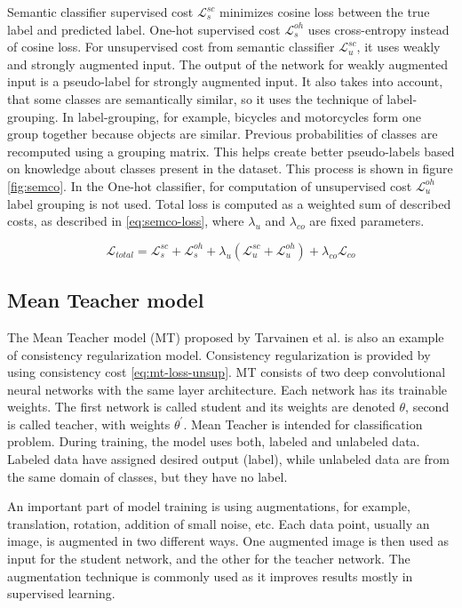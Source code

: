 Semantic classifier supervised cost $\mathcal{L}^{sc}_s$ minimizes cosine loss between the true label and predicted label. One-hot supervised cost $\mathcal{L}^{oh}_s$ uses cross-entropy instead of cosine loss. 
For unsupervised cost from semantic classifier $\mathcal{L}^{sc}_u$, it uses weakly and strongly augmented input. The output of the network for weakly augmented input is a pseudo-label for strongly augmented input. It also takes into account, that some classes are semantically similar, so it uses the technique of label-grouping. In label-grouping, for example, bicycles and motorcycles form one group together because objects are similar. Previous probabilities of classes are recomputed using a grouping matrix. This helps create better pseudo-labels based on knowledge about classes present in the dataset. This process is shown in figure \ref{fig:semco}. In the One-hot classifier, for computation of unsupervised cost $\mathcal{L}^{oh}_u$ label grouping is not used. Total loss is computed as a weighted sum of described costs, as described in \ref{eq:semco-loss}, where $\lambda_u $ and $\lambda_{co}$ are fixed parameters. \cite{nassar} 


\begin{equation}
    \mathcal{L}_{total} = \mathcal{L}^{sc}_s + \mathcal{L}^{oh}_s + \lambda_u (\mathcal{L}^{sc}_u + \mathcal{L}^{oh}_u) + \lambda_{co} \mathcal{L}_{co}
    \label{eq:semco-loss}
\end{equation}


\subsection{Mean Teacher model}
\label{mtm-chapter}
The Mean Teacher model (MT) proposed by Tarvainen et al.\cite{tarvainen} is also an example of consistency regularization model. Consistency regularization is provided by using consistency cost \ref{eq:mt-loss-unsup}. MT consists of two deep convolutional neural networks with the same layer architecture. Each network has its trainable weights. The first network is called student and its weights are denoted $\theta$, second is called teacher, with weights $\theta^\prime$. Mean Teacher is intended for classification problem.
During training, the model uses both, labeled and unlabeled data. Labeled data have assigned desired output (label), while unlabeled data are from the same domain of classes, but they have no label. 

An important part of model training is using augmentations, for example, translation, rotation, addition of small noise, etc. Each data point, usually an image, is augmented in two different ways. One augmented image is then used as input for the student network, and the other for the teacher network. The augmentation technique is commonly used as it improves results mostly in supervised learning. %

